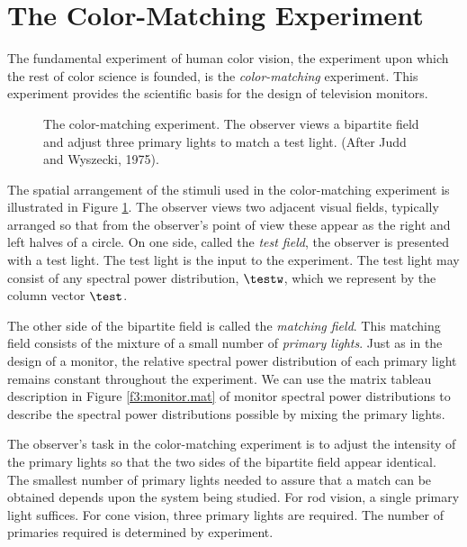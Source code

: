 
\section{The Color-Matching Experiment}

The fundamental experiment of human color vision, the experiment upon
which the rest of color science is founded, is the 
{\em color-matching} experiment.
This experiment provides the 
scientific basis for the design of television monitors.

\begin{figure}
\centerline {
}
\caption[Color Matching Experiment] {
The color-matching experiment.
The observer views a bipartite field and
adjust three primary lights to match
a test light.
(After Judd and Wyszecki, 1975).
}
\label{f3:colormatch}
\end{figure}
The spatial arrangement of the stimuli used
in the color-matching experiment is illustrated in Figure \ref{f3:colormatch}.
The observer views two adjacent visual fields, typically
arranged so that from the observer's point of view these appear
as the right and left halves of a circle.
On one side, called the {\em test field},
the observer is presented with a test light.
The test light is the input to the experiment.
The test light may
consist of any spectral power distribution, $\testw$,
which we represent by the column vector $\test$.
\nocite{JuddWyszecki}

The other side of the bipartite field is called the 
{\em matching field}.
This matching field consists
of the mixture of a small number
of {\em primary lights}.
Just as in the design of a monitor, the relative spectral
power distribution of each primary light remains constant
throughout the experiment.
We can use the matrix tableau description in Figure \ref{f3:monitor.mat}
of monitor spectral power distributions 
to describe the spectral power distributions possible 
by mixing the primary lights.

The observer's task in the color-matching experiment is to adjust
the intensity of the primary lights
so that the two sides of the
bipartite field appear identical.
The smallest number of primary lights needed to assure
that a match can be obtained
depends upon the system being studied.
For rod vision, a single primary light suffices.
For cone vision, three primary lights are required.
The number of primaries required is determined by experiment.

